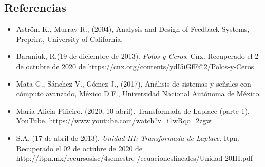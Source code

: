 \documentclass[10pt]{article}
\begin{document}
	
	\newcommand{\iu}{{i\mkern1mu}}
	\addtolength{\jot}{1em}

	
	
	
	
	
	
	
	
	
	\subsection*{Referencias}
	
	\begin{itemize}
		\item Aström K., Murray R., (2004), Analysis and Design of Feedback Systems, Preprint, University of California.
		\item Baraniuk, R.(19 de diciembre de 2013).\textit{ Polos y Ceros}. Cnx. Recuperado el 2 de octubre  de 2020 de
		\subitem https://cnx.org/contents/ydI5iGfF@2/Polos-y-Ceros	
		\item Mata G., Sánchez V., Gómez J., (2017), Análisis de sistemas y señales con cómputo avanzado, México D.F., Universidad Nacional Autónoma de México.
		\item Maria Alicia Piñeiro. (2020, 10 abril). Transformada de Laplace (parte 1). YouTube. 
		\subitem https://www.youtube.com/watch?v=i1wRqo\_2zgw
		
		\item	S.A. (17 de abril de 2013).\textit{ Unidad III: Transformada de Laplace}. Itpn. Recuperado el 02 de octubre de 2020 de http://itpn.mx/recursosisc/4semestre-/ecuacioneslineales/Unidad-20III.pdf
	\end{itemize}
	
	
\end{document}
